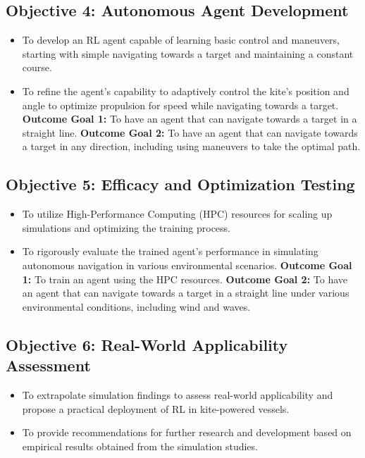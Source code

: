 \subsection*{Objective 4: Autonomous Agent Development}
\begin{itemize}
    \item To develop an RL agent capable of learning basic control and maneuvers, starting with simple navigating towards a target and maintaining a constant course.
    \item To refine the agent's capability to adaptively control the kite's position and angle to optimize propulsion for speed while navigating towards a target.
    \newline\textbf{Outcome Goal 1:} To have an agent that can navigate towards a target in a straight line.
    \newline\textbf{Outcome Goal 2:} To have an agent that can navigate towards a target in any direction, including using maneuvers to take the optimal path.
\end{itemize}

\subsection*{Objective 5: Efficacy and Optimization Testing}
\begin{itemize}
    \item To utilize High-Performance Computing (HPC) resources for scaling up simulations and optimizing the training process.
    \item To rigorously evaluate the trained agent’s performance in simulating autonomous navigation in various environmental scenarios.
    \newline\textbf{Outcome Goal 1:} To train an agent using the HPC resources.
    \newline\textbf{Outcome Goal 2:} To have an agent that can navigate towards a target in a straight line under various environmental conditions, including wind and waves.
\end{itemize}

\subsection*{Objective 6: Real-World Applicability Assessment}
\begin{itemize}
    \item To extrapolate simulation findings to assess real-world applicability and propose a  practical deployment of RL in kite-powered vessels.
    \item To provide recommendations for further research and development based on empirical results obtained from the simulation studies.
\end{itemize}

